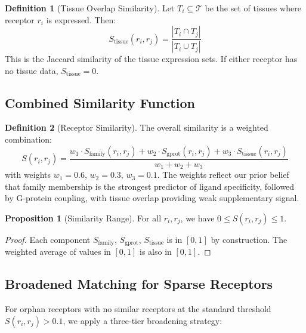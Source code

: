 \documentclass[12pt,oneside]{article}
\theoremstyle{definition}
\newtheorem{definition}{Definition}[section]
\newtheorem{proposition}{Proposition}[section]
\begin{document}
\begin{definition}[Tissue Overlap Similarity]
Let $T_i \subseteq \mathcal{T}$ be the set of tissues where receptor $r_i$ is expressed. Then:
\begin{equation}
S_{\text{tissue}}(r_i, r_j) = \frac{|T_i \cap T_j|}{|T_i \cup T_j|}
\label{eq:tissue_sim}
\end{equation}
This is the Jaccard similarity of the tissue expression sets. If either receptor has no tissue data, $S_{\text{tissue}} = 0$.
\end{definition}

\subsection{Combined Similarity Function}

\begin{definition}[Receptor Similarity]
The overall similarity is a weighted combination:
\begin{equation}
S(r_i, r_j) = \frac{w_1 \cdot S_{\text{family}}(r_i, r_j) + w_2 \cdot S_{\text{gprot}}(r_i, r_j) + w_3 \cdot S_{\text{tissue}}(r_i, r_j)}{w_1 + w_2 + w_3}
\label{eq:combined_sim}
\end{equation}
with weights $w_1 = 0.6$, $w_2 = 0.3$, $w_3 = 0.1$. The weights reflect our prior belief that family membership is the strongest predictor of ligand specificity, followed by G-protein coupling, with tissue overlap providing weak supplementary signal.
\end{definition}

\begin{proposition}[Similarity Range]
\label{prop:sim_range}
For all $r_i, r_j$, we have $0 \leq S(r_i, r_j) \leq 1$.
\end{proposition}

\begin{proof}
Each component $S_{\text{family}}$, $S_{\text{gprot}}$, $S_{\text{tissue}}$ is in $[0, 1]$ by construction. The weighted average of values in $[0, 1]$ is also in $[0, 1]$.
\end{proof}

\subsection{Broadened Matching for Sparse Receptors}

For orphan receptors with no similar receptors at the standard threshold $S(r_i, r_j) > 0.1$, we apply a three-tier broadening strategy:
\end{document}

